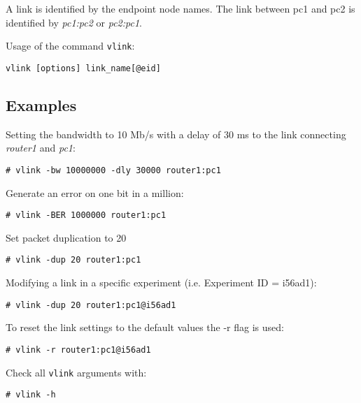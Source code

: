 A link is identified by the endpoint node names. The link between pc1 and pc2 is identified by \emph{pc1:pc2} or \emph{pc2:pc1}.

Usage of the command \texttt{vlink}:

\texttt{vlink [options] link\_name[@eid]} \hfill

\subsection{Examples}

Setting the bandwidth to 10 Mb/s with a delay of 30 ms to the link connecting \emph{router1} and \emph{pc1}:

\texttt{\# vlink -bw 10000000 -dly 30000 router1:pc1}

Generate an error on one bit in a million:

\texttt{\# vlink -BER 1000000 router1:pc1}

Set packet duplication to 20%

\texttt{\# vlink -dup 20 router1:pc1}

Modifying a link in a specific experiment (i.e. Experiment ID = i56ad1):

\texttt{\# vlink -dup 20 router1:pc1@i56ad1}

To reset the link settings to the default values the -r flag is used:

\texttt{\# vlink -r router1:pc1@i56ad1}

Check all \texttt{vlink} arguments with:

\texttt{\# vlink -h}
